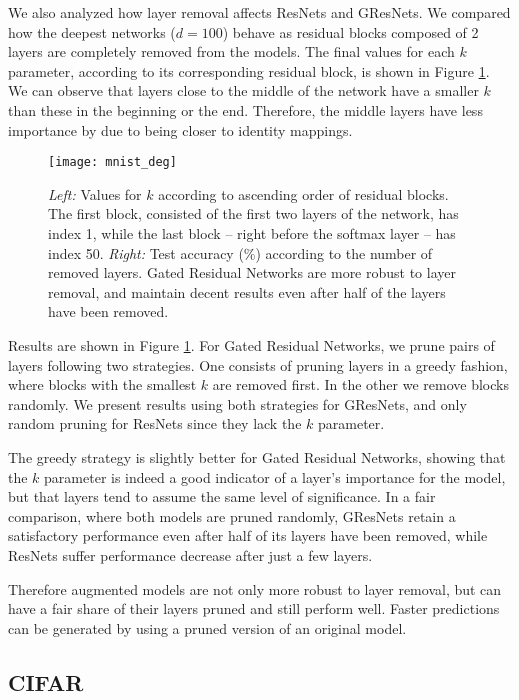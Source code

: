 \documentclass{article} %
\begin{document}
We also analyzed how layer removal affects ResNets and GResNets. We compared how the deepest networks ($d = 100$) behave as residual blocks composed of 2 layers are completely removed from the models. The final values for each $k$ parameter, according to its corresponding residual block, is shown in Figure \ref{pruning}. We can observe that layers close to the middle of the network have a smaller $k$ than these in the beginning or the end. Therefore, the middle layers have less importance by due to being closer to identity mappings.


\begin{figure}[!ht]
  \centering
    \texttt{[image: mnist\_deg]}
  \caption{\textit{Left: } Values for $k$ according to ascending order of residual blocks. The first block, consisted of the first two layers of the network, has index 1, while the last block -- right before the softmax layer -- has index 50. \textit{Right:} Test accuracy (\%) according to the number of removed layers. Gated Residual Networks are more robust to layer removal, and maintain decent results even after half of the layers have been removed. }
\label{pruning}
\end{figure}

Results are shown in Figure \ref{pruning}. For Gated Residual Networks, we prune pairs of layers following two strategies. One consists of pruning layers in a greedy fashion, where blocks with the smallest $k$ are removed first. In the other we remove blocks randomly. We present results using both strategies for GResNets, and only random pruning for ResNets since they lack the $k$ parameter.

The greedy strategy is slightly better for Gated Residual Networks, showing that the $k$ parameter is indeed a good indicator of a layer's importance for the model, but that layers tend to assume the same level of significance. In a fair comparison, where both models are pruned randomly, GResNets retain a satisfactory performance even after half of its layers have been removed, while ResNets suffer performance decrease after just a few layers.

Therefore augmented models are not only more robust to layer removal, but can have a fair share of their layers pruned and still perform well. Faster predictions can be generated by using a pruned version of an original model.



\subsection{CIFAR}
\end{document}
